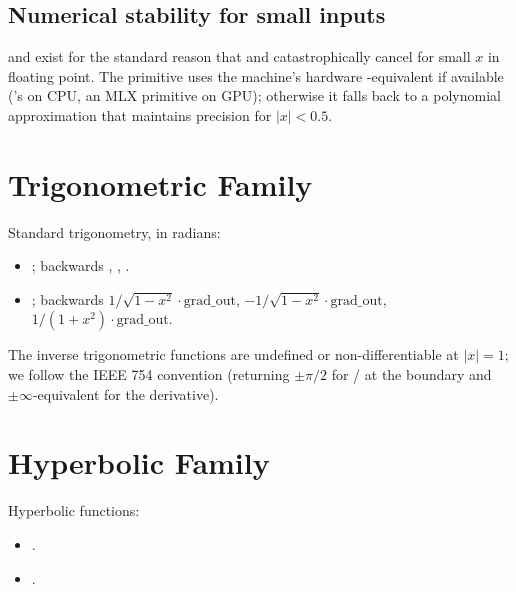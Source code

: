\subsection{Numerical stability for small inputs}
\label{ssec:unary_functions:expm1_log1p}

 and  exist for the standard reason that
 and  catastrophically cancel for
small \(x\) in floating point. The  primitive uses the
machine's hardware -equivalent if available
('s  on CPU, an MLX primitive on GPU);
otherwise it falls back to a polynomial approximation that
maintains precision for \(|x| < 0.5\).

\section{Trigonometric Family}
\label{sec:unary_functions:trig}

Standard trigonometry, in radians:

\begin{itemize}
  \item {}; backwards
    , , .
  \item {}; backwards $1/\sqrt{1
    - x^2} \cdot \text{grad\_out}$, $-1/\sqrt{1 - x^2} \cdot
    \text{grad\_out}$, $1/(1 + x^2) \cdot \text{grad\_out}$.
\end{itemize}

The inverse trigonometric functions are undefined or
non-differentiable at \(|x| = 1\); we follow the IEEE 754
convention (returning \(\pm\pi/2\) for  /  at
the boundary and \(\pm\infty\)-equivalent for the derivative).

\section{Hyperbolic Family}
\label{sec:unary_functions:hyper}

Hyperbolic functions:

\begin{itemize}
  \item {}.
  \item {}.
\end{itemize}

